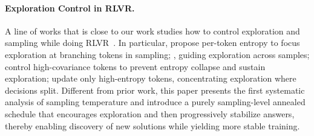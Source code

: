 \paragraph{Exploration Control in RLVR.} A line of works that is close to our work studies how to control exploration and sampling while doing RLVR~\citep{hou2025t1, cheng2025reasoning,tangoptimizing,chen2025pass,cui2025entropy,wang2025beyond,xiong2025minimalist,deng2025trial,xu2025not,zheng2025act,dou2025improving, li2025treepo}. In particular, \citet{cheng2025reasoning} propose per-token entropy to focus exploration at branching tokens in sampling; , guiding exploration across samples; \citet{cui2025entropy} control high-covariance tokens to prevent entropy collapse and sustain exploration; \citet{wang2025beyond} update only high-entropy tokens, concentrating exploration where decisions split.  Different from prior work, this paper presents the first systematic analysis of sampling temperature and introduce a purely sampling-level annealed schedule that encourages exploration and then progressively stabilize answers, thereby enabling discovery of new solutions while yielding more stable training.


